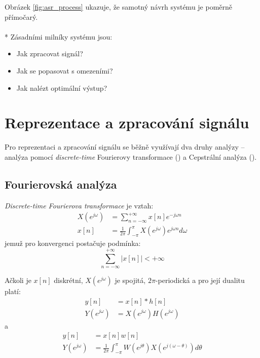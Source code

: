 Obrázek \ref{fig:asr_process} ukazuje, že samotný návrh systému je poměrně přímočarý.
\\\\*
Zásadními milníky systému jsou:

\begin{itemize}
\item Jak zpracovat signál?
\item Jak se popasovat s omezeními?
\item Jak nalézt optimální výstup?
\end{itemize}

\section{Reprezentace a zpracování signálu}

Pro reprezentaci a zpracování signálu se běžně využívají dva druhy analýzy -- analýza pomocí {\sl discrete-time} Fourierovy transformace () a Cepstrální analýza ().

\subsection{Fourierovská analýza}

{\sl Discrete-time Fourierova transformace} je vztah:
%
\begin{align}
	\label{eq:dtft}
	X(e^{j\omega}) &= \sum\limits_{n=-\infty}^{+\infty} x[n] e^{-j\omega n}\\
	          x[n] &= \frac{1}{2\pi} \int_{-\pi}^{\pi} X(e^{j\omega})e^{j\omega n} d\omega
\end{align}
%
jemuž pro konvergenci postačuje podmínka:
%
\begin{equation}
	\label{eq:dtft_conv}
	\sum\limits_{n=-\infty}^{+\infty} |x[n]| < +\infty
\end{equation} 

Ačkoli je $x[n]$ diskrétní, $X(e^{j\omega})$ je spojitá, $2\pi$-periodická a pro její dualitu platí:
%
\begin{align}
	\label{eq:dtft_d}
	          y[n] &= x[n] * h[n]\\
	Y(e^{j\omega}) &= X(e^{j\omega})H(e^{j\omega})
\end{align}
%
a
%
\begin{align}
	          y[n] &= x[n]w[n]\\
	Y(e^{j\omega}) &= \frac{1}{2\pi} \int_{-\pi}^{\pi} W(e^{j\theta})X(e^{j(\omega - \theta)})d\theta
\end{align}

